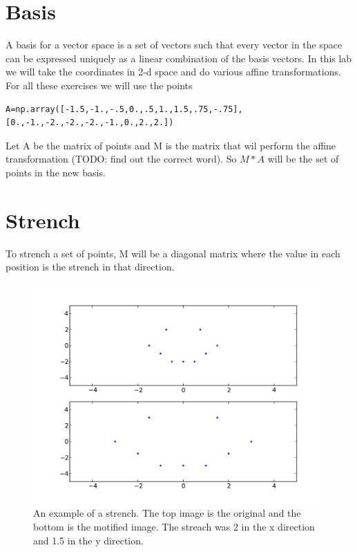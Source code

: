 \label{lab:ChangeBasis}


\section*{Basis}

A basis for a vector space is a set of vectors such that every vector in the space can be expressed uniquely as a linear combination of the basis vectors. In this lab we will take the coordinates in 2-d space and do various affine transformations. For all these exercises we will use the points
\begin{lstlisting}
A=np.array([-1.5,-1.,-.5,0.,.5,1.,1.5,.75,-.75],[0.,-1.,-2.,-2.,-2.,-1.,0.,2.,2.])
\end{lstlisting}
Let A be the matrix of points and M is the matrix that wil perform the affine transformation (TODO: find out the correct word). So $M*A$ will be the set of points in the new basis. 

\section*{Strench}
To strench a set of points, M will be a diagonal matrix where the value in each position is the strench in that direction.

\begin{figure}[H]
\includegraphics[scale = .5]{strench.pdf}
\caption{An example of a strench. The top image is the original and the bottom is the motified image. The streach was 2 in the x direction and 1.5 in the y direction.}
\end{figure}

